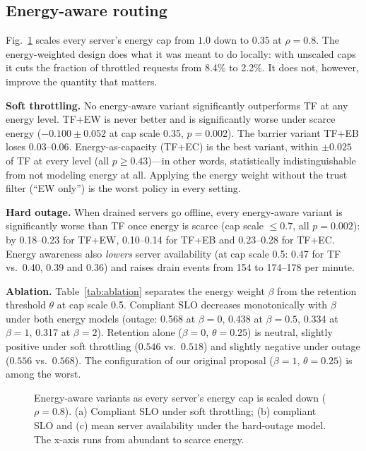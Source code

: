 \documentclass[journal]{IEEEtran}
\begin{document}
\subsection{Energy-aware routing}\label{sec:res-energy}

Fig.~\ref{fig:energy} scales every server's energy cap from $1.0$ down to $0.35$ at $\rho=0.8$. The energy-weighted design does what it was meant to do locally: with unscaled caps it cuts the fraction of throttled requests from 8.4\% to 2.2\%. It does not, however, improve the quantity that matters.

\textbf{Soft throttling.} No energy-aware variant significantly outperforms TF at any energy level. TF+EW is never better and is significantly worse under scarce energy ($-0.100\pm0.052$ at cap scale 0.35, $p=0.002$). The barrier variant TF+EB loses $0.03$--$0.06$. Energy-as-capacity (TF+EC) is the best variant, within $\pm0.025$ of TF at every level (all $p\ge0.43$)---in other words, statistically indistinguishable from not modeling energy at all. Applying the energy weight without the trust filter (``EW only'') is the worst policy in every setting.

\textbf{Hard outage.} When drained servers go offline, every energy-aware variant is significantly worse than TF once energy is scarce (cap scale $\le0.7$, all $p=0.002$): by 0.18--0.23 for TF+EW, 0.10--0.14 for TF+EB and 0.23--0.28 for TF+EC. Energy awareness also \emph{lowers} server availability (at cap scale 0.5: 0.47 for TF vs.\ 0.40, 0.39 and 0.36) and raises drain events from 154 to 174--178 per minute.

\textbf{Ablation.} Table~\ref{tab:ablation} separates the energy weight $\beta$ from the retention threshold $\theta$ at cap scale 0.5. Compliant SLO decreases monotonically with $\beta$ under both energy models (outage: 0.568 at $\beta=0$, 0.438 at $\beta=0.5$, 0.334 at $\beta=1$, 0.317 at $\beta=2$). Retention alone ($\beta=0$, $\theta=0.25$) is neutral, slightly positive under soft throttling ($0.546$ vs.\ $0.518$) and slightly negative under outage ($0.556$ vs.\ $0.568$). The configuration of our original proposal ($\beta=1$, $\theta=0.25$) is among the worst.

\begin{figure}[t]
\centering
\resizebox{\textwidth}{!}{%
}
\caption{Energy-aware variants as every server's energy cap is scaled down ($\rho=0.8$). (a) Compliant SLO under soft throttling; (b) compliant SLO and (c) mean server availability under the hard-outage model. The x-axis runs from abundant to scarce energy.}
\label{fig:energy}
\end{figure}
\end{document}
